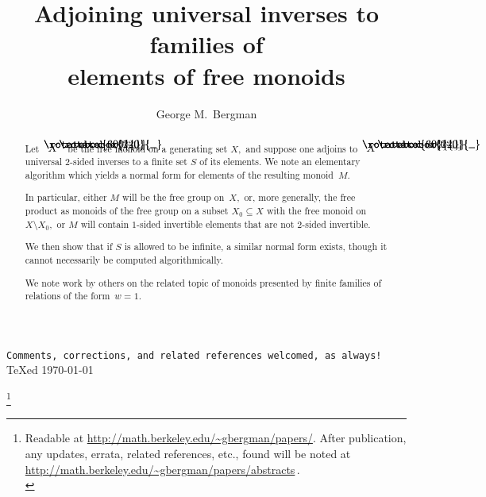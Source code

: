 \documentclass{amsart}
\numberwithin{equation}{section}
\newcommand{\langl}{\begin{picture}(.51em,1em)
\put(.11em,.33em){\rotatebox{60}{\line(1,0){.55em}}}
\put(.11em,.33em){\rotatebox{300}{\line(1,0){.55em}}}
\end{picture}}
\newcommand{\rangl}{\begin{picture}(.5em,1em)
\put(.09em,.33em){\rotatebox{120}{\line(1,0){.55em}}}
\put(.09em,.33em){\rotatebox{240}{\line(1,0){.55em}}}
\end{picture}}
\begin{document}
\begin{center}
\texttt{Comments, corrections,
and related references welcomed, as always!}\\[.5em]
{\TeX}ed \today
\\[.5em]
\vspace{2em}
\end{center}

\title%
[Adjoining universal inverses to free monoids]%
{Adjoining universal inverses to families of\\ elements of free monoids}
\thanks{%
Readable at \url{http://math.berkeley.edu/~gbergman/papers/}.
After publication, any updates, errata, related references,
etc., found will be noted at
\url{http://math.berkeley.edu/~gbergman/papers/abstracts}\,.\\
%
%
}


\author{George M.\ Bergman}
\address{Department of Mathematics\\
University of California\\
Berkeley, CA 94720-3840, USA}

\begin{abstract}
Let $\langl X\rangl$ be the free monoid on a generating set
$X,$ and suppose one adjoins to $\langl X\rangl$ universal
$\!2\!$-sided inverses to a finite set $S$ of its elements.
We note an elementary algorithm which yields a normal form for
elements of the resulting monoid~$M.$

In particular, either $M$ will be the free group on~$X,$
or, more generally, the free product as monoids of the
free group on a subset $X_0\subseteq X$ with the free monoid on
$X\setminus X_0,$ or $M$ will contain $\!1\!$-sided invertible elements
that are not $\!2\!$-sided invertible.

We then show that if $S$ is allowed to be infinite, a similar
normal form exists, though it cannot necessarily be
computed algorithmically.

We note work by others on
the related topic of monoids presented by finite
families of relations of the form~$w=1.$
\end{abstract}
\maketitle
\end{document}
